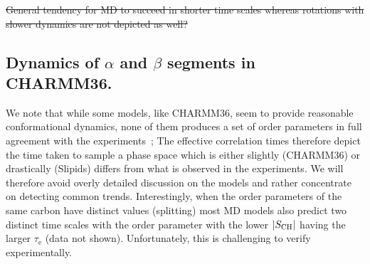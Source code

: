 \documentclass[journal=jpcbfk,manuscript=article,layout=twocolumn]{achemso}
\begin{document}
\sout{General tendency for MD to succeed in shorter time scales whereas rotations with slower dynamics are not depicted as well?}

\subsection*{Dynamics of $\alpha$ and $\beta$ segments in CHARMM36.}



We note that while some models, like CHARMM36, seem to provide reasonable conformational dynamics, none of them produces a set of order parameters in full agreement with the experiments~\cite{botan15}; The effective correlation times therefore depict the time taken to sample a phase space which is either slightly (CHARMM36) or drastically (Slipids) differs from what is observed in the experiments. We will therefore avoid overly detailed discussion on the models and rather concentrate on detecting common trends. Interestingly, when the order parameters of the same carbon have distinct values (splitting) most MD models also predict two distinct time scales with the order parameter with the lower $|S_{\rm{CH}}|$ having the larger $\tau_\mathrm{e}$ (data not shown). Unfortunately, this is challenging to verify experimentally. 

\end{document}
